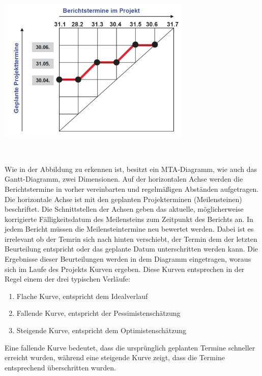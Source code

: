 \documentclass[a4paper]{article}
\makeatletter
\newcommand\liststyleLSxvi{%
\renewcommand\theenumi{\arabic{enumi}}
\renewcommand\theenumii{\alph{enumii}}
\renewcommand\theenumiii{\roman{enumiii}}
\renewcommand\theenumiv{\arabic{enumiv}}
\renewcommand\labelenumi{\theenumi.}
\renewcommand\labelenumii{\theenumii.}
\renewcommand\labelenumiii{\theenumiii.}
\renewcommand\labelenumiv{\theenumiv.}
}
\newcommand\captionof[1]{\def\@captype{#1}\caption}
\makeatother
\begin{document}
\bigskip

{\centering\sffamily
\includegraphics[width=9.225cm,height=6.92cm]{INMAusarbeitung02-img007.png}
\captionof{figure}[Aufteilung der Achsen der MTA]{Aufteilung der Achsen der MTA}
\label{seq:refIllustration6}
 \ 
\par}

{\sffamily
Wie in der Abbildung zu erkennen ist, besitzt ein MTA-Diagramm, wie auch das Gantt-Diagramm, zwei Dimensionen. Auf der
horizontalen Achse werden die Berichtstermine in vorher vereinbarten und regelmäßigen Abständen aufgetragen. Die
horizontale Achse ist mit den geplanten Projekterminen (Meilensteinen) beschriftet. Die Schnittstellen der Achsen geben
das aktuelle, möglicherweise korrigierte Fälligkeitsdatum des Meilensteins zum Zeitpunkt des Berichts an. In jedem
Bericht müssen die Meilensteintermine neu bewertet werden. Dabei ist es irrelevant ob der Temrin sich nach hinten
verschiebt, der Termin dem der letzten Beurteilung entspricht oder das geplante Datum unterschritten werden kann. Die
Ergebnisse dieser Beurteilungen werden in dem Diagramm eingetragen, woraus sich im Laufe des Projekts Kurven ergeben.
Diese Kurven entsprechen in der Regel einem der drei typischen Verläufe:}


\bigskip

\liststyleLSxvi
\begin{enumerate}
\item {\sffamily
Flache Kurve, entspricht dem Idealverlauf}
\item {\sffamily
Fallende Kurve, entspricht der Pessimistenschätzung}
\item {\sffamily
Steigende Kurve, entspricht dem Optimistenschätzung}
\end{enumerate}

\bigskip

{\sffamily
Eine fallende Kurve bedeutet, dass die ursprünglich geplanten Termine schneller erreicht wurden, während eine steigende
Kurve zeigt, dass die Termine entsprechend überschritten wurden.}
\end{document}
